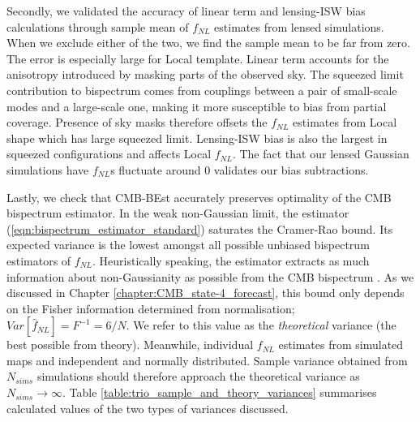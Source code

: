 Secondly, we validated the accuracy of linear term and lensing-ISW bias calculations through sample mean of $f_{NL}$ estimates from lensed simulations. When we exclude either of the two, we find the sample mean to be far from zero. The error is especially large for Local template. Linear term accounts for the anisotropy introduced by masking parts of the observed sky. The squeezed limit contribution to bispectrum comes from couplings between a pair of small-scale modes and a large-scale one, making it more susceptible to bias from partial coverage. Presence of sky masks therefore offsets the $f_{NL}$ estimates from Local shape which has large squeezed limit. Lensing-ISW bias is also the largest in squeezed configurations and affects Local $f_{NL}$. The fact that our lensed Gaussian simulations have $f_{NL}$s fluctuate around $0$ validates our bias subtractions.

Lastly, we check that CMB-BEst accurately preserves optimality of the CMB bispectrum estimator. In the weak non-Gaussian limit, the estimator (\ref{eqn:bispectrum_estimator_standard}) saturates the Cramer-Rao bound. Its expected variance is the lowest amongst all possible unbiased bispectrum estimators of $f_{NL}$. Heuristically speaking, the estimator extracts as much information about non-Gaussianity as possible from the CMB bispectrum . As we discussed in Chapter \ref{chapter:CMB_state-4_forecast}, this bound only depends on the Fisher information determined from normalisation; $Var[\hat{f}_{NL}]=F^{-1}=6/N$. We refer to this value as the \textit{theoretical} variance (the best possible from theory). Meanwhile, individual $f_{NL}$ estimates from simulated maps and independent and normally distributed. Sample variance obtained from $N_{sims}$ simulations should therefore approach the theoretical variance as $N_{sims}\rightarrow\infty$. Table \ref{table:trio_sample_and_theory_variances} summarises calculated values of the two types of variances discussed.

